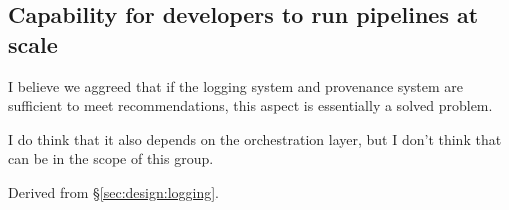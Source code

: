 \subsection{Capability for developers to run pipelines at scale}


I believe we aggreed that if the logging system and provenance system are sufficient to meet recommendations, this aspect is essentially a solved problem.

I do think that it also depends on the orchestration layer, but I don't think that can be in the scope of this group.

Derived from \S\ref{sec:design:logging}.

